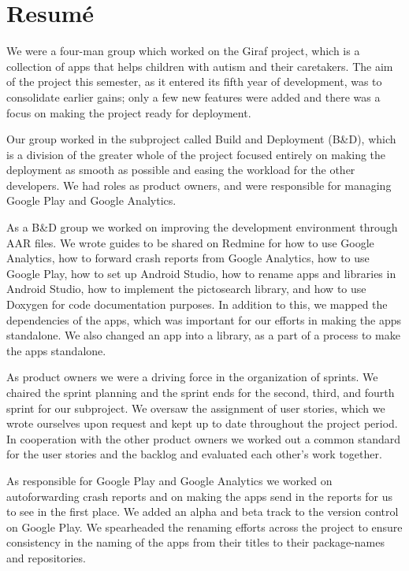 \section*{Resumé}
We were a four-man group which worked on the Giraf project, which is a collection of apps that helps children with autism and their caretakers. The aim of the project this semester, as it entered its fifth year of development, was to consolidate earlier gains; only a few new features were added and there was a focus on making the project ready for deployment.

Our group worked in the subproject called Build and Deployment (B\&D), which is a division of the greater whole of the project focused entirely on making the deployment as smooth as possible and easing the workload for the other developers. We had roles as product owners, and were responsible for managing Google Play and Google Analytics.

As a B\&D group we worked on improving the development environment through AAR files. We wrote guides to be shared on Redmine for how to use Google Analytics, how to forward crash reports from Google Analytics, how to use Google Play, how to set up Android Studio, how to rename apps and libraries in Android Studio, how to implement the pictosearch library, and how to use Doxygen for code documentation purposes. In addition to this, we mapped the dependencies of the apps, which was important for our efforts in making the apps standalone. We also changed an app into a library, as a part of a process to make the apps standalone.

As product owners we were a driving force in the organization of sprints. We chaired the sprint planning and the sprint ends for the second, third, and fourth sprint for our subproject. We oversaw the assignment of user stories, which we wrote ourselves upon request and kept up to date throughout the project period. In cooperation with the other product owners we worked out a common standard for the user stories and the backlog and evaluated each other’s work together.

As responsible for Google Play and Google Analytics we worked on autoforwarding crash reports and on making the apps send in the reports for us to see in the first place. We added an alpha and beta track to the version control on Google Play. We spearheaded the renaming efforts across the project to ensure consistency in the naming of the apps from their titles to their package-names and repositories.